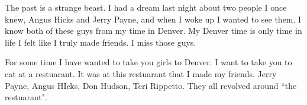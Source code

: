 The past is a strange beast. I had a dream last night about two people I once knew, Angus Hicks and Jerry Payne, and when I woke up I wanted to see them. I know both of these guys from my time in Denver. My Denver time is only time in life I felt like I truly made friends. I miss those guys.

For some time I have wanted to take you girls to Denver. I want to take you to eat at a restuarant. It was at this restuarant that I made my friends. Jerry Payne, Angus HIcks, Don Hudson, Teri Rippetto. They all revolved around ``the restuarant".